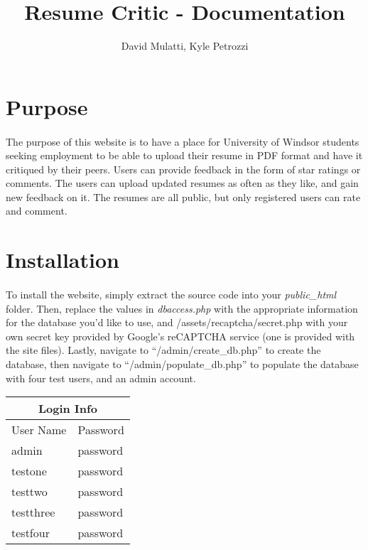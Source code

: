\documentclass[11pt,letterpaper,titlepage]{article}
\title{Resume Critic - Documentation}
\author{David Mulatti, Kyle Petrozzi}
\date{}
\begin{document}
    \maketitle


    \section{Purpose}
        \paragraph{}
        The purpose of this website is to have a place for University of Windsor
        students seeking employment to be able to upload their resume in PDF
        format and have it critiqued by their peers. Users can provide feedback
        in the form of star ratings or comments. The users can upload updated
        resumes as often as they like, and gain new feedback on it. The resumes
        are all public, but only registered users can rate and comment.

    \section{Installation}
        \paragraph{}
        To install the website, simply extract the source code into your
        \emph{public\_html} folder. Then, replace the values in
        \emph{dbaccess.php} with the appropriate information for the database
        you'd like to use, and /assets/recaptcha/secret.php with your own
        secret key provided by Google's reCAPTCHA service (one is provided with
        the site files).
        Lastly, navigate to ``/admin/create\_db.php'' to
        create the database, then navigate to ``/admin/populate\_db.php'' to
        populate the database with four test users, and an admin account.

        \begin{center}
            \begin{tabular}{ | l | l | }
                \multicolumn{2}{c}{Login Info} \\
                \hline
                User Name & Password \\ \hline
                admin & password \\ \hline
                testone & password \\ \hline
                testtwo & password \\ \hline
                testthree & password \\ \hline
                testfour & password \\
                \hline
            \end{tabular}
        \end{center}
\end{document}
